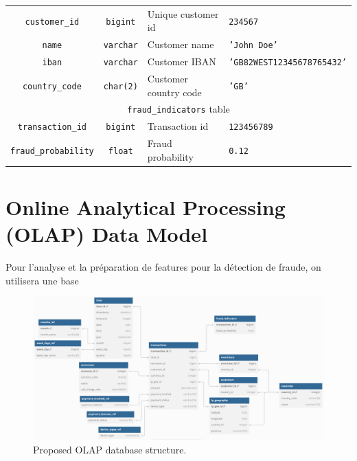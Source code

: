 \documentclass[11pt,a4paper,computermodern]{article}
\newcommand{\code}{\texttt}
\begin{document}
\begin{table}[ht]
\begin{threeparttable}
\begin{tabularx}{0.99\textwidth}{c c >{\centering\arraybackslash}X >{\centering\arraybackslash}X}
			\code{customer\_id} & \code{bigint} & Unique customer id & \code{234567} \\
			\code{name} & \code{varchar} & Customer name & \code{'John Doe'} \\
			\code{iban} & \code{varchar} & Customer IBAN & \code{'GB82WEST12345678765432'} \\
			\code{country\_code} & \code{char(2)} & Customer country code  & \code{'GB'} \\
			\midrule
			\multicolumn{4}{c}{\code{fraud\_indicators} table}\\
			\code{transaction\_id} & \code{bigint} & Transaction id & \code{123456789} \\
			\code{fraud\_probability} & \code{float} & Fraud probability & \code{0.12} \\
			\bottomrule
		\end{tabularx}
	\end{threeparttable}
\end{table}


\section*{Online Analytical Processing (OLAP) Data Model}

Pour l'analyse et la préparation de features pour la détection de fraude, on utilisera une base 


\begin{figure}
	\centering
	\includegraphics[scale=0.46]{./figures/OLAP}
	\caption{Proposed OLAP database structure.}
	\label{fig:OLAP}
\end{figure}
\end{document}
